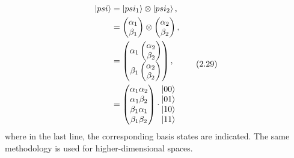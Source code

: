 \documentclass{article}
\begin{document}
\begin{align}
    \begin{split}
        \ket{psi}&=\ket{psi_{1}}\otimes\ket{psi_{2}},\\
        &=\begin{pmatrix}
            \alpha_{1}\\
            \beta_{1}
        \end{pmatrix}
        \otimes
        \begin{pmatrix}
            \alpha_{2}\\
            \beta_{2}
        \end{pmatrix},\\
        &=\begin{pmatrix}
            \alpha_{1} \begin{pmatrix}
                \alpha_{2}\\
                \beta_{2}
            \end{pmatrix}\\
            \beta_{1} \begin{pmatrix}
                \alpha_{2}\\
                \beta_{2}
            \end{pmatrix}
        \end{pmatrix},\\
        &=\begin{pmatrix}
            \alpha_{1}\alpha_{2}\\
            \alpha_{1}\beta_{2}\\
            \beta_{1}\alpha_{1}\\
            \beta_{1}\beta_{2}
        \end{pmatrix}
        \cdot
        \begin{matrix}
            \ket{00}\\
            \ket{01}\\
            \ket{10}\\
            \ket{11}
        \end{matrix}
    \end{split} \tag{2.29}
\end{align}
where in the last line, the corresponding basis states are indicated. The same methodology is used for higher-dimensional spaces.
\end{document}
